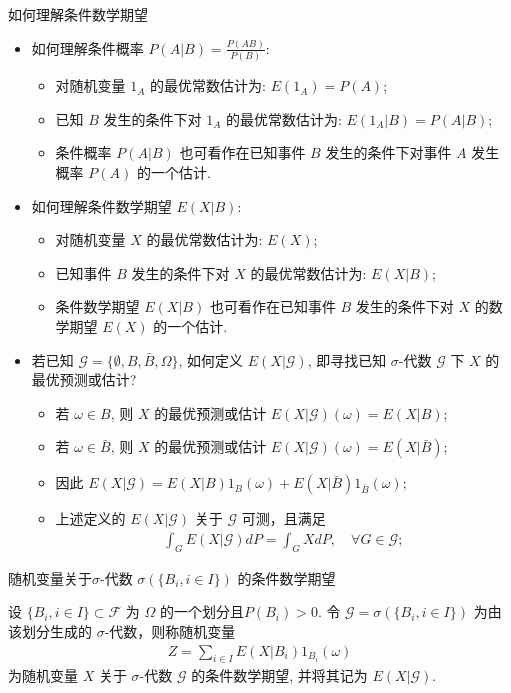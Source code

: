 \documentclass[Prob-All.tex]{subfiles}
\begin{document}
\begin{frame}{如何理解条件数学期望}
 \begin{itemize}[<+-|alert@+>]
 \item 如何理解条件概率 $P(A|B)=\frac{P(AB)}{P(B)}$:
 \begin{itemize}[<+-|alert@+>]
 \item 对随机变量 $1_A$ 的最优常数估计为: $E(1_A)=P(A)$;
 \item 已知 $B$ 发生的条件下对 $1_A$ 的最优常数估计为: $E(1_A|B)=P(A|B)$;
 \item 条件概率 $P(A|B)$ 也可看作在已知事件 $B$ 发生的条件下对事件 $A$ 发生概率 $P(A)$ 的一个估计.%
 \end{itemize}
 \item 如何理解条件数学期望 $E(X|B)$:
 \begin{itemize}[<+-|alert@+>]
 \item 对随机变量 $X$ 的最优常数估计为: $E(X)$;
 \item 已知事件 $B$ 发生的条件下对 $X$ 的最优常数估计为: $E(X|B)$;
 \item 条件数学期望 $E(X|B)$ 也可看作在已知事件 $B$ 发生的条件下对 $X$ 的数学期望 $E(X)$ 的一个估计.
 \end{itemize}
 \item 若已知 $\mathcal{G}=\{\emptyset, B, \bar{B}, \Omega\}$, 如何定义 $E(X|\mathcal{G})$, 即寻找已知 $\sigma$-代数 $\mathcal{G}$ 下 $X$ 的最优预测或估计?
 \begin{itemize}[<+-|alert@+>]
 \item 若 $\omega\in B$, 则 $X$ 的最优预测或估计 $E(X|\mathcal{G})(\omega)=E(X|B)$;
 \item 若 $\omega\in \bar{B}$, 则 $X$ 的最优预测或估计 $E(X|\mathcal{G})(\omega)=E(X|\bar{B})$;
 \item 因此 $
 E(X|\mathcal{G})=E(X|B)1_B(\omega)+E(X|\bar{B})1_{\bar{B}}(\omega);$
 \item 上述定义的 $E(X|\mathcal{G})$ 关于 $\mathcal{G}$ 可测，且满足\vspace{-0.15cm}
 {\small \begin{eqnarray*}
 \int_G E(X|\mathcal{G})dP=\int_G XdP, \quad \forall G\in \mathcal{G};
 \end{eqnarray*}}
 \end{itemize}
 \end{itemize}
\end{frame}

\begin{frame}{随机变量关于$\sigma$-代数 $\sigma(\{B_i, i\in I\})$ 的条件数学期望}
\begin{defi}
  设 $\{B_i, i\in I\}\subset\mathcal{F}$ 为 $\Omega$ 的一个划分且$P(B_i)>0$. 令 $\mathcal{G}=\sigma(\{B_i, i\in I\})$ 为由该划分生成的 $\sigma$-代数，则称随机变量
  \begin{eqnarray*}
	Z=\sum_{i\in I}E(X|B_i)1_{B_i}(\omega)
  \end{eqnarray*}
  为随机变量 $X$ 关于 $\sigma$-代数 $\mathcal{G}$ 的条件数学期望, 并将其记为 $E(X|\mathcal{G})$.
\end{defi}


\end{frame}
\end{document}
